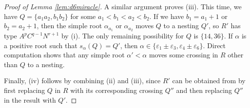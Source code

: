 \documentclass[11pt]{amsart}
\theoremstyle{plain}
\theoremstyle{definition}
\theoremstyle{remark}
\numberwithin{equation}{subsection}
\newcommand{\al}{\alpha}
\newcommand{\ep}{\varepsilon}
\begin{document}
\begin{proof}[Proof of Lemma \ref{lem:d6miracle}]
A similar argument proves (iii). This time, we have $Q= \{a_1a_2,b_1b_2\}$ for
some $a_1 < b_1 < a_2 < b_2$. If we have $b_1=a_1+1$ or $b_2=a_2+1$, then the
simple root $\al_{a_1}$ or $\al_{a_2}$ moves $Q$ to a nesting $Q'$, so $R'$ has
type $A^pC^{q-1}N^{r+1}$ by (i). The only remaining possibility for $Q$ is
$\{14,36\}$. If $\al$ is a positive root such that $s_\al(Q)=Q'$, then $\al\in
\{\ep_1\pm\ep_3,\ep_4\pm\ep_6\}$. Direct computation shows that any simple root
$\al'<\al$ moves some crossing in $R$ other than $Q$ to a nesting.

Finally, (iv) follows by combining (ii) and (iii), since $R'$ can be obtained
from by first replacing $Q$ in $R$ with its corresponding crossing $Q''$ and
then replacing $Q''$ in the result with $Q'$.
\end{proof}
\end{document}
